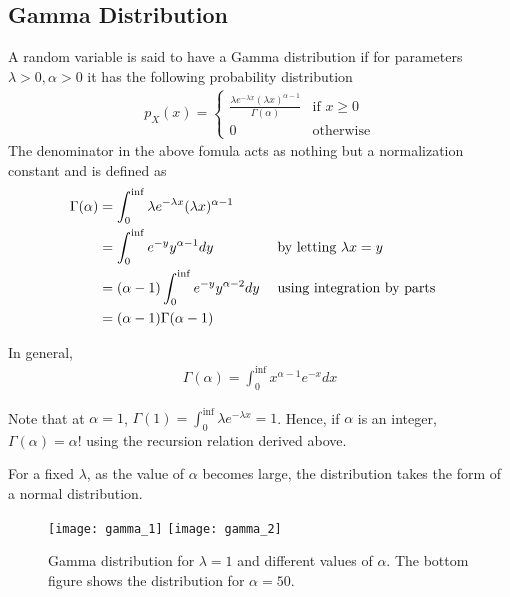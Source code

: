 \documentclass[../probability-notes.tex]{subfiles}
\begin{document}
    \subsection{Gamma Distribution}
    A random variable is said to have a Gamma distribution if for parameters $\lambda > 0, \alpha > 0$ it has the following probability distribution
    \begin{align*}
        p_{X}(x) = \begin{cases} 
            \frac{\lambda e^{-\lambda x} (\lambda x)^{\alpha - 1}}{\Gamma(\alpha)} &\mbox{if $x \geq 0$}\\
            0 &\mbox{otherwise}
        \end{cases}
    \end{align*}
    The denominator in the above fomula acts as nothing but a normalization constant and is defined as
    \begin{alignat*}{2}
        \Gamma (\alpha) &= \int_{0}^{\inf} \lambda e^{-\lambda x} (\lambda x)^{\alpha - 1}\\
        &= \int_{0}^{\inf} e^{-y} y^{\alpha - 1} dy &&\text{\;by letting $\lambda x = y$}\\
        &= (\alpha - 1) \int_{0}^{\inf} e^{-y} y^{\alpha - 2} dy &&\text{\;using integration by parts}\\
        &= (\alpha - 1) \Gamma (\alpha - 1)
    \end{alignat*}

    In general,
    \begin{align*}
        \Gamma(\alpha) = \int_{0}^{\inf} x^{\alpha - 1}e^{-x}dx
    \end{align*}

    Note that at $\alpha = 1$, $\Gamma (1) = \int_{0}^{\inf} \lambda e^{-\lambda x} = 1$. Hence, if $\alpha$ is an integer, $\Gamma(\alpha) = \alpha !$ using the recursion relation derived above.\newline

    For a fixed $\lambda$, as the value of $\alpha$ becomes large, the distribution takes the form of a normal distribution.

    \begin{figure}[h]
    \texttt{[image: gamma\_1]}
    \texttt{[image: gamma\_2]}
    \centering
    \caption{Gamma distribution for $\lambda = 1$ and different values of $\alpha$. The bottom figure shows the distribution for $\alpha = 50$.}
    \label{fig:gamma_1} %
    \end{figure}
\end{document}
